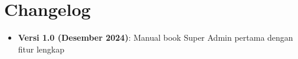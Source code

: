 \documentclass[12pt,a4paper]{article}
\begin{document}
\section{Changelog}
\begin{itemize}
\item \textbf{Versi 1.0 (Desember 2024)}: Manual book Super Admin pertama dengan fitur lengkap
\end{itemize}
\end{document}
